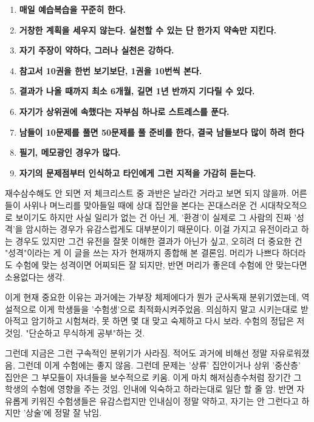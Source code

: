 \vspace{5mm}
\begin{enumerate}
    \item \textbf{매일 예습복습을 꾸준히 한다.}
    \item \textbf{거창한 계획을 세우지 않는다. 실천할 수 있는 단 한가지 약속만 지킨다.}
    \item \textbf{자기 주장이 약하다, 그러나 실천은 강하다.}
    \item \textbf{참고서 10권을 한번 보기보단, 1권을 10번씩 본다.}
    \item \textbf{결과가 나올 때까지 최소 6개월, 길면 1년 반까지 기다릴 수 있다.}
    \item \textbf{자기가 상위권에 속했다는 자부심 하나로 스트레스를 푼다.}
    \item \textbf{ 남들이 10문제를 풀면 50문제를 풀 준비를 한다, 결국 남들보다 많이 하려 한다}
    \item \textbf{ 필기, 메모광인 경우가 많다.}
    \item \textbf{ 자기의 문제점부터 인식하고 타인에게 그런 지적을 가감히 듣는다.}
\end{enumerate}
\vspace{5mm}

재수삼수해도 안 되면 저 체크리스트 중 과반은 날라간 거라고 보면 되지 않을까.
어른들이 사위나 며느리를 맞아들일 때에 상대 집안을 본다는 꼰대스러운 건 시대착오적으로 보이기도 하지만
사실 일리가 없는 건 아닌 게, '환경'이 실제로 그 사람의 진짜 '성격'을 암시하는 경우가 유감스럽게도 대부분이기 때문이다.
이걸 가지고 유전이라고 하는 경우도 있지만 그건 유전을 잘못 이해한 결과가 아닌가 싶고,
오히려 더 중요한 건 "성격"이라는 게 이 글을 쓰는 자가 현재까지 종합해 본 결론임.
머리가 나쁘다 하더라도 수험에 맞는 성격이면 어찌되든 잘 되지만, 반면 머리가 좋은데 수험에 안 맞는다면 소용없다는 생각.
\vspace{5mm}

이게 현재 중요한 이유는
과거에는 가부장 체제에다가 뭔가 군사독재 분위기였는데, 역설적으로 이게 학생들을 '수험생'으로 최적화시켜주었음.
의심하지 말고 시키는대로 받아적고 암기하고 시험쳐라, 못 하면 몇 대 맞고 숙제하고 다시 보라.
수험의 정답은 저것임. "단순하고 무식하게 공부"하는 것.
\vspace{5mm}

그런데 지금은 그런 구속적인 분위기가 사라짐.
적어도 과거에 비해선 정말 자유로워졌음, 그런데 이게 수험에는 좋지 않음.
그런데 문제는 '상류' 집안이거나 상위 '중산층' 집안은 그 부모들이 자녀들을 보수적으로 키움.
이게 마치 해저심층수처럼 장기간 그 학생의 수험에 영향을 주는 것임.
인내에 익숙하고 하라는대로 일단 할 줄 암.
반면 자유롭게 키워진 수험생들은 유감스럽지만 인내심이 정말 약하고,
자기는 안 그런다고 하지만 '상술'에 정말 잘 낚임.
\vspace{5mm}

